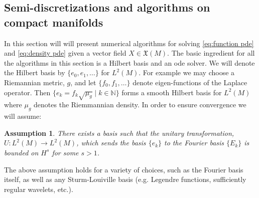 \documentclass[final,leqno]{siamltex1213}
\newtheorem{ass}{Assumption}
\begin{document}
%
%

\subsection{Semi-discretizations and algorithms on compact manifolds}

In this section will will present numerical algorithms for solving \eqref{eq:function pde} and \eqref{eq:density pde} given a vector field $X \in \mathfrak{X}(M)$.
The basic ingredient for all the algorithms in this section is a Hilbert basis and an ode solver.
We will denote the Hilbert basis by $\{ e_{0}, e_{1},\dots \}$ for $L^{2}(M)$.
For example we may choose a Riemannian metric, $g$, and let $\{ f_{0}, f_{1},\dots \}$ denote  eigen-functions of the Laplace operator.
Then $\{ e_{k} = f_{k} \sqrt{\mu_{g}} \mid k \in \mathbb{N} \}$ forms a smooth Hilbert basis for $L^{2}(M)$ where $\mu_{g}$ denotes the Riemmannian density.
In order to ensure convergence we will assume:
\begin{ass} \label{ass:basis}
	There exists a basis such that the unitary transformation, $U:L^{2}(M) \to L^{2}(M)$, which sends the basis $\{ e_{k} \}$ to the Fourier basis $\{E_{k} \}$
	is bounded on $H^{s}$ for some $s > 1$.
\end{ass}
The above assumption holds for a variety of choices, such as the Fourier basis itself, as well as any Sturm-Louiville basis (e.g. Legendre functions, sufficiently regular wavelets, etc.).
\end{document}
